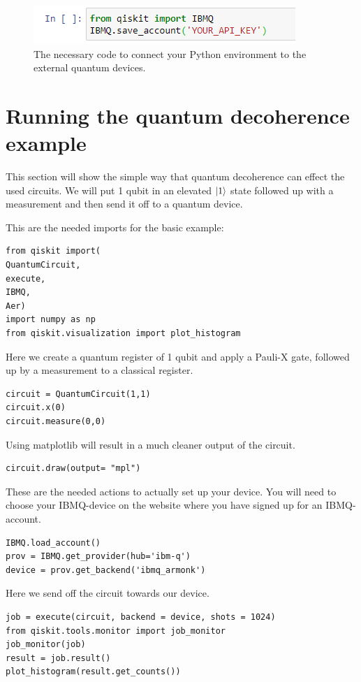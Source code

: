 \begin{figure}
	\centering
	\includegraphics[scale = 0.75]{../Demonstration/img/IBMQ.PNG}
	\caption{The necessary code to connect your Python environment to the external quantum devices.}
\end{figure}


\section{Running the quantum decoherence example}
This section will show the simple way that quantum decoherence can effect the used circuits. We will put 1 qubit in an elevated $\ket{1}$ state followed up with a measurement and then send it off to a quantum device.

This are the needed imports for the basic example:

\begin{verbatim}
from qiskit import(
QuantumCircuit,
execute, 
IBMQ,
Aer)
import numpy as np
from qiskit.visualization import plot_histogram
\end{verbatim}

Here we create a quantum register of 1 qubit and apply a Pauli-X gate, followed up by a measurement to a classical register.

\begin{verbatim}
circuit = QuantumCircuit(1,1)
circuit.x(0)
circuit.measure(0,0)
\end{verbatim}

Using matplotlib will result in a much cleaner output of the circuit.

\begin{verbatim}
circuit.draw(output= "mpl")
\end{verbatim}

These are the needed actions to actually set up your device. You will need to choose your IBMQ-device on the website where you have signed up for an IBMQ-account.

\begin{verbatim}
IBMQ.load_account()
prov = IBMQ.get_provider(hub='ibm-q')
device = prov.get_backend('ibmq_armonk')
\end{verbatim}

Here we send off the circuit towards our device.

\begin{verbatim}
job = execute(circuit, backend = device, shots = 1024)
from qiskit.tools.monitor import job_monitor
job_monitor(job)
result = job.result()
plot_histogram(result.get_counts())
\end{verbatim}

